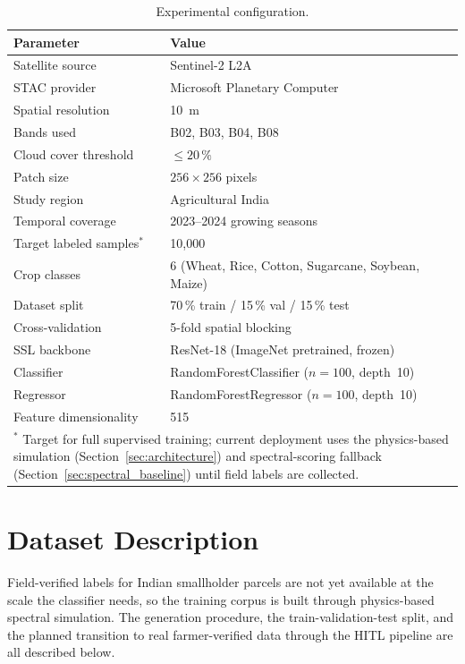 \documentclass[12pt,a4paper,oneside]{report}
\begin{document}
\begin{table}[h]
\centering
\caption{Experimental configuration.}
\label{tab:expsetup}
\begin{tabular}{ll}
\toprule
\textbf{Parameter} & \textbf{Value} \\
\midrule
Satellite source          & Sentinel-2 L2A \\
STAC provider             & Microsoft Planetary Computer \\
Spatial resolution        & 10~m \\
Bands used                & B02, B03, B04, B08 \\
Cloud cover threshold     & $\leq 20\,\%$ \\
Patch size                & $256 \times 256$ pixels \\
Study region              & Agricultural India \\
Temporal coverage         & 2023--2024 growing seasons \\
Target labeled samples$^*$ & 10,000 \\
Crop classes              & 6 (Wheat, Rice, Cotton, Sugarcane, Soybean, Maize) \\
Dataset split             & 70\,\% train / 15\,\% val / 15\,\% test \\
Cross-validation          & 5-fold spatial blocking \\
SSL backbone              & ResNet-18 (ImageNet pretrained, frozen) \\
Classifier                & RandomForestClassifier ($n=100$, depth~10) \\
Regressor                 & RandomForestRegressor ($n=100$, depth~10) \\
Feature dimensionality    & 515 \\
\bottomrule
\multicolumn{2}{p{13.5cm}}{\footnotesize $^*$ Target for full supervised training; current deployment uses the physics-based simulation (Section~\ref{sec:architecture}) and spectral-scoring fallback (Section~\ref{sec:spectral_baseline}) until field labels are collected.}
\end{tabular}
\end{table}

\section{Dataset Description}
\label{sec:dataset}

Field-verified labels for Indian smallholder parcels are not yet available at the scale the classifier needs, so the training corpus is built through physics-based spectral simulation. The generation procedure, the train-validation-test split, and the planned transition to real farmer-verified data through the HITL pipeline are all described below.
\end{document}

